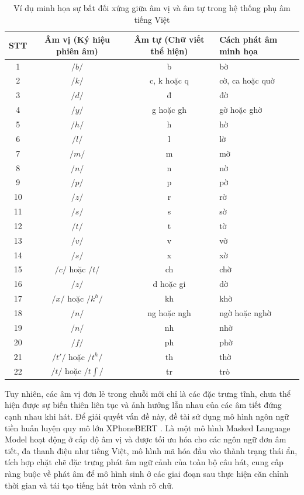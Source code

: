 \documentclass[a4paper,13pt,oneside]{report}
\begin{document}
\begin{table}[H]
\centering
\caption{Ví dụ minh họa sự bất đối xứng giữa âm vị và âm tự trong hệ thống phụ âm tiếng Việt}
\label{tab:vietnamese_consonants}
\small
\renewcommand{\arraystretch}{0.92}
\setlength{\tabcolsep}{2.5pt}
\begin{tabular}{|c|c|c|l|}
\hline
\textbf{STT} & \textbf{Âm vị (Ký hiệu phiên âm)} & \textbf{Âm tự (Chữ viết thể hiện)} & \textbf{Cách phát âm minh họa} \\ \hline
1  & $/b/$ & b & bờ \\ \hline
2  & $/k/$ & c, k hoặc q & cờ, ca hoặc quờ \\ \hline
3  & $/d/$ & đ & đờ \\ \hline
4  & $/y/$ & g hoặc gh & gờ hoặc ghờ \\ \hline
5  & $/h/$ & h & hờ \\ \hline
6  & $/l/$ & l & lờ \\ \hline
7  & $/m/$ & m & mờ \\ \hline
8  & $/n/$ & n & nờ \\ \hline
9  & $/p/$ & p & pờ \\ \hline
10 & $/z/$ & r & rờ \\ \hline
11 & $/s/$ & s & sờ \\ \hline
12 & $/t/$ & t & tờ \\ \hline
13 & $/v/$ & v & vờ \\ \hline
14 & $/s/$ & x & xờ \\ \hline
15 & $/c/$ hoặc $/t/$ & ch & chờ \\ \hline
16 & $/z/$ & d hoặc gi & dờ \\ \hline
17 & $/x/$ hoặc $/k^h/$ & kh & khờ \\ \hline
18 & $/n/$ & ng hoặc ngh & ngờ hoặc nghờ \\ \hline
19 & $/n/$ & nh & nhờ \\ \hline
20 & $/f/$ & ph & phờ \\ \hline
21 & $/t'/ $ hoặc $/t^h/$ & th & thờ \\ \hline
22 & $/t/$ hoặc $/t\int/$ & tr & trò \\ \hline
\end{tabular}
\end{table}



Tuy nhiên, các âm vị đơn lẻ trong chuỗi mới chỉ là các đặc trưng tĩnh, chưa thể hiện được sự biến thiên liên tục và ảnh hưởng lẫn nhau của các âm tiết đứng cạnh nhau khi hát. Để giải quyết vấn đề này, đề tài sử dụng mô hình ngôn ngữ tiền huấn luyện quy mô lớn XPhoneBERT \cite{xphonebert}. Là một mô hình Masked Language Model hoạt động ở cấp độ âm vị và được tối ưu hóa cho các ngôn ngữ đơn âm tiết, đa thanh điệu như tiếng Việt, mô hình mã hóa đầu vào thành trạng thái ẩn, tích hợp chặt chẽ đặc trưng phát âm ngữ cảnh của toàn bộ câu hát, cung cấp ràng buộc về phát âm để mô hình sinh ở các giai đoạn sau thực hiện căn chỉnh thời gian và tái tạo tiếng hát tròn vành rõ chữ.
\end{document}

